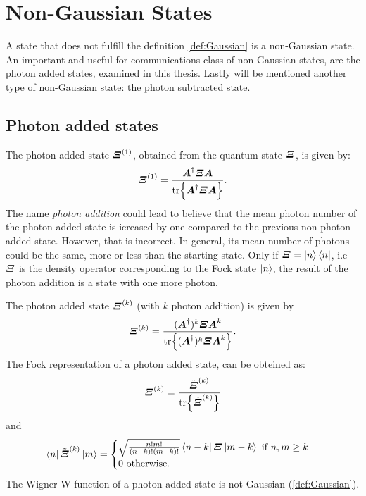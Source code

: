 \section{Non-Gaussian States} 
    A state that does not fulfill the definition \ref{def:Gaussian} is a non-Gaussian state.
    An important and useful for communications class of non-Gaussian states, are the photon 
    added states, examined in this thesis. Lastly will be mentioned another type of non-Gaussian
    state: the photon subtracted state.
    
    \subsection{Photon added states}
        \label{PAS}
        The photon added state $\bm{\relax{\varXi}}^{(1)}$, obtained from the quantum state $\bm{\relax{\varXi}}$,
        is given by:
        \begin{equation}
            \bm{\relax{\varXi}}^{(1)}=\frac{\bm{\relax{A}}^\dagger\bm{\relax{\varXi}}\bm{\relax{A}}}
            {\tr{\bm{\relax{A}}^\dagger\bm{\relax{\varXi}}\bm{\relax{A}}}}.
            \label{eq:photonAddedState}
        \end{equation}
        The name \emph{photon addition} could lead to believe that the mean photon number of the 
        photon added state is icreased by one compared to the previous non photon added state.
        However, that is incorrect.
        In general, its mean number of photons could be the same, more or less than the starting state.
        Only if $\bm{\relax{\varXi}}=\ket{n}\bra{n}$, i.e $\bm{\relax{\varXi}}$ is the density operator corresponding to
        the Fock state $\ket{n}$, the result of the photon addition is a state with one more photon.

        The photon added state $\bm{\relax{\varXi}}^{(k)}$ (with $k$ photon addition) is given by
        \begin{equation}
            \bm{\relax{\varXi}}^{(k)}=\frac{(\bm{\relax{A}}^\dagger)^k\bm{\relax{\varXi}}\bm{\relax{A}}^k}
            {\tr{(\bm{\relax{A}}^\dagger)^k\bm{\relax{\varXi}}\bm{\relax{A}}^k}}.
        \end{equation}
        The Fock representation of a photon added state, can be obteined as:
        \begin{equation}
            \bm{\relax{\varXi}}^{(k)}=\frac{\tilde{\bm{\relax{\varXi}}}^{(k)}}{\tr{\tilde{\bm{\relax{\varXi}}}^{(k)}}}
            \label{eq:FR_photonAdded}
        \end{equation}
        and
        \begin{equation*}
            \bra{n}\tilde{\Operator{\varXi}}^{(k)}\ket{m}=
            \begin{cases}
                \sqrt{\frac{n!m!}{(n-k)!(m-k)!}}\bra*{n-k}\Operator{\varXi}\ket*{m-k}\mbox{\ if\ }n,m \geq k\\
                0\mbox{\ otherwise}.
            \end{cases}
        \end{equation*}
        The Wigner W-function of a photon added state is not Gaussian (\ref{def:Gaussian}).

